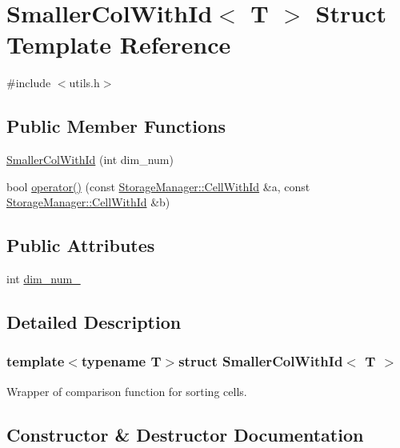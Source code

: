 \hypertarget{structSmallerColWithId}{}\section{Smaller\+Col\+With\+Id$<$ T $>$ Struct Template Reference}
\label{structSmallerColWithId}


{\ttfamily \#include $<$utils.\+h$>$}

\subsection*{Public Member Functions}
\begin{DoxyCompactItemize}
\item 
\hyperlink{structSmallerColWithId_aea962351d4087da7d1246e8b2a2a2066}{Smaller\+Col\+With\+Id} (int dim\+\_\+num)
\item 
bool \hyperlink{structSmallerColWithId_a7e8964a473c811ed093c12665d414113}{operator()} (const \hyperlink{structStorageManager_1_1CellWithId}{Storage\+Manager\+::\+Cell\+With\+Id} \&a, const \hyperlink{structStorageManager_1_1CellWithId}{Storage\+Manager\+::\+Cell\+With\+Id} \&b)
\end{DoxyCompactItemize}
\subsection*{Public Attributes}
\begin{DoxyCompactItemize}
\item 
int \hyperlink{structSmallerColWithId_ac1f9cf8e7d9a5715ac1fb670a5f3aac9}{dim\+\_\+num\+\_\+}
\end{DoxyCompactItemize}


\subsection{Detailed Description}
\subsubsection*{template$<$typename T$>$struct Smaller\+Col\+With\+Id$<$ T $>$}

Wrapper of comparison function for sorting cells. 

\subsection{Constructor \& Destructor Documentation}
\hypertarget{structSmallerColWithId_aea962351d4087da7d1246e8b2a2a2066}{}
